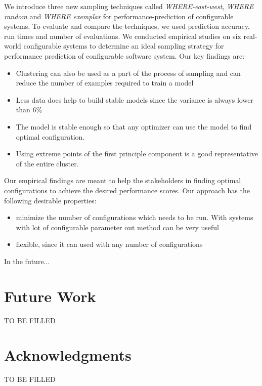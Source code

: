\documentclass{sig-alternative}
\newcommand{\bi}{\begin{itemize}}%
\newcommand{\ei}{\end{itemize}}
\begin{document}
We introduce three new sampling techniques called \textit{WHERE-east-west}, \textit{WHERE random} and \textit{WHERE exemplar} for performance-prediction of configurable systems. To evaluate and compare the techniques, we used prediction accuracy, run times and number of evaluations. We conducted empirical studies on six real-world configurable systems to determine an ideal sampling strategy for performance prediction of configurable software system. Our key findings are:
\bi
    \item{Clustering can also be used as a part of the process of sampling and can reduce the number of examples required to train a model}
    \item{Less data does help to build stable models since the variance is always lower than 6\%}
    \item{The model is stable enough so that any optimizer can use the model to find optimal configuration.}
    \item{Using extreme points of the first principle component is a good representative of the entire cluster.}
\ei

Our empirical findings are meant to help the stakeholders in finding optimal configurations to achieve the desired performance scores. Our approach has the following desirable properties:
\bi
\item{minimize the number of configurations which needs to be run. With systems with lot of configurable parameter out method can be very useful}
\item{flexible, since it can used with any number of configurations}
\ei
In the future...

\section{Future Work}

TO BE FILLED
 
 

\section*{Acknowledgments}
TO BE FILLED
 
\vspace*{0.5mm}
 
 


\balance
  

   



  


  
\end{document}
